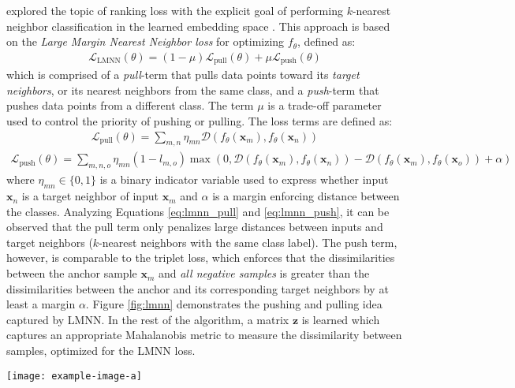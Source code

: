 		\cite{Weinberger2009LMNN} explored the topic of ranking loss with the explicit goal of performing $k$-nearest neighbor classification in the learned embedding space \citep{Hermans2017DefenseTripletLoss}.  This approach is based on the \textit{Large Margin Nearest Neighbor loss} for optimizing $f_{\theta}$, defined as:
		\begin{align}
			\mathcal{L}_{\text{LMNN}}(\theta) = (1-\mu)\mathcal{L}_{\text{pull}}(\theta) + \mu \mathcal{L}_{\text{push}}(\theta)
		\end{align}
		\noindent
		which is comprised of a \textit{pull}-term that pulls data points toward its \textit{target neighbors}, or its nearest neighbors from the same class, and a \textit{push}-term that pushes data points from a different class.  The term $\mu$ is a trade-off parameter used to control the priority of pushing or pulling. The loss terms are defined as:
		\begin{align} \label{eq:lmnn_pull}
			\mathcal{L}_{\text{pull}}(\theta) =  \sum_{m,n}\eta_{mn} \mathcal{D}(f_{\theta}(\bm{x}_{m}),f_{\theta}(\bm{x}_{n}))
		\end{align}
		\begin{align} \label{eq:lmnn_push}
		\mathcal{L}_{\text{push}}(\theta) = \sum_{m,n,o}\eta_{mn}(1-l_{m,o}) \max(0,\mathcal{D}(f_{\theta}(\bm{x}_{m}),f_{\theta}(\bm{x}_{n})) - \mathcal{D}(f_{\theta}(\bm{x}_{m}),f_{\theta}(\bm{x}_{o})) + \alpha )
		\end{align}
		\noindent
		where  $\eta_{mn} \in \{0,1\}$ is a binary indicator variable used to express whether input $\bm{x}_{n}$ is a target neighbor of input $\bm{x}_{m}$ and $\alpha$ is a margin enforcing distance between the classes.  Analyzing Equations \ref{eq:lmnn_pull} and \ref{eq:lmnn_push}, it can be observed that the pull term only penalizes large distances between inputs and target neighbors ($k$-nearest neighbors with the same class label).  The push term, however, is comparable to the triplet loss, which enforces that the dissimilarities between the anchor sample $\bm{x}_{m}$ and \textit{all negative samples} is greater than the dissimilarities between the anchor and its corresponding target neighbors by at least a margin $\alpha$.  Figure \ref{fig:lmnn} demonstrates the pushing and pulling idea captured by LMNN.  In the rest of the algorithm, a matrix $\bm{z}$ is learned which captures an appropriate Mahalanobis metric to measure the dissimilarity between samples, optimized for the LMNN loss.  
		
		
		\begin{center}
			\begin{figure*}[h]
				\centering
				\texttt{[image: example-image-a]}
				\caption[Large Margin $k$-NN]{Large Margin $k$-NN}
				\label{fig:lmnn}
			\end{figure*}
		\end{center}
		
